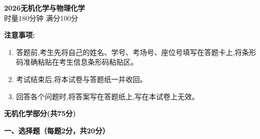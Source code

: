 \begin{center}
    {\LARGE \textbf{2026无机化学与物理化学}} \\[2ex]
    {\large 时量180分钟 \quad 满分100分}
\end{center}

\vspace{0.5cm}
\noindent\textbf{注意事项:}
\begin{enumerate}[label=\arabic*., parsep=0pt, itemsep=0pt]
    \item 答题前,考生先将自己的姓名、学号、考场号、座位号填写在答题卡上,将条形码准确粘贴在考生信息条形码粘贴区。
    \item 考试结束后,将本试卷与答题纸一并收回。
    \item 回答各个问题时,将答案写在答题纸上,写在本试卷上无效。
\end{enumerate}

\vspace{1cm}
\begin{center}
    {\Large \textbf{无机化学部分(共75分)}}
\end{center}

\vspace{0.5cm}
\noindent\textbf{一、选择题（每题2分，共20分）}

